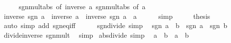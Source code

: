 \begin{isabellebody}
%
\isadelimproof
%
\endisadelimproof
%
\isatagproof
{}\isamarkupfalse%
\ {\isacharminus}{\kern0pt}\isanewline
\ \ \isamarkupfalse%
\ sgn{\isacharunderscore}{\kern0pt}mult{\isacharunderscore}{\kern0pt}abs\ {\isacharbrackleft}{\kern0pt}of\ {\isachardoublequoteopen}inverse\ a{\isachardoublequoteclose}{\isacharbrackright}{\kern0pt}\ sgn{\isacharunderscore}{\kern0pt}mult{\isacharunderscore}{\kern0pt}abs\ {\isacharbrackleft}{\kern0pt}of\ a{\isacharbrackright}{\kern0pt}\isanewline
\ \ \isamarkupfalse%
\ {\isachardoublequoteopen}inverse\ {\isacharparenleft}{\kern0pt}sgn\ a{\isacharparenright}{\kern0pt}\ {\isacharasterisk}{\kern0pt}\ {\isasymbar}inverse\ a{\isasymbar}\ {\isacharequal}{\kern0pt}\ inverse\ {\isacharparenleft}{\kern0pt}sgn\ a\ {\isacharasterisk}{\kern0pt}\ {\isasymbar}a{\isasymbar}{\isacharparenright}{\kern0pt}{\isachardoublequoteclose}\isanewline
\ \ \ \ \isamarkupfalse%
\ simp\isanewline
\ \ \isamarkupfalse%
\ \isamarkupfalse%
\ {\isacharquery}{\kern0pt}thesis\ \isamarkupfalse%
\ {\isacharparenleft}{\kern0pt}auto\ simp\ add{\isacharcolon}{\kern0pt}\ sgn{\isacharunderscore}{\kern0pt}eq{\isacharunderscore}{\kern0pt}{}{\isacharunderscore}{\kern0pt}iff{\isacharparenright}{\kern0pt}\isanewline
{}\isamarkupfalse%
%
\endisatagproof
{\isafoldproof}%
%
\isadelimproof
\isanewline
%
\endisadelimproof
\ \ \ \ \isanewline
{}\isamarkupfalse%
\ sgn{\isacharunderscore}{\kern0pt}divide\ {\isacharbrackleft}{\kern0pt}simp{\isacharbrackright}{\kern0pt}{\isacharcolon}{\kern0pt}\isanewline
\ \ {\isachardoublequoteopen}sgn\ {\isacharparenleft}{\kern0pt}a\ {\isacharslash}{\kern0pt}\ b{\isacharparenright}{\kern0pt}\ {\isacharequal}{\kern0pt}\ sgn\ a\ {\isacharslash}{\kern0pt}\ sgn\ b{\isachardoublequoteclose}\isanewline
%
\isadelimproof
\ \ %
\endisadelimproof
%
\isatagproof
{}\isamarkupfalse%
\ divide{\isacharunderscore}{\kern0pt}inverse\ sgn{\isacharunderscore}{\kern0pt}mult\ \isamarkupfalse%
\ simp%
\endisatagproof
{\isafoldproof}%
%
\isadelimproof
\isanewline
%
\endisadelimproof
\isanewline
{}\isamarkupfalse%
\ abs{\isacharunderscore}{\kern0pt}divide\ {\isacharbrackleft}{\kern0pt}simp{\isacharbrackright}{\kern0pt}{\isacharcolon}{\kern0pt}\isanewline
\ \ {\isachardoublequoteopen}{\isasymbar}a\ {\isacharslash}{\kern0pt}\ b{\isasymbar}\ {\isacharequal}{\kern0pt}\ {\isasymbar}a{\isasymbar}\ {\isacharslash}{\kern0pt}\ {\isasymbar}b{\isasymbar}{\isachardoublequoteclose}\isanewline

\end{isabellebody}
